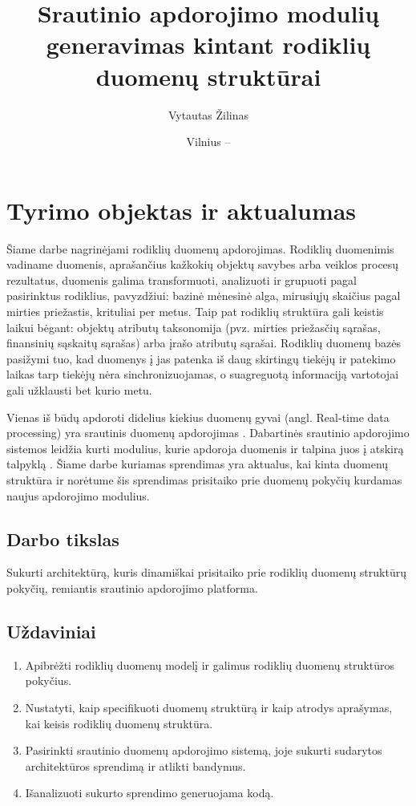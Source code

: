 \documentclass{VUMIFPSbakalaurinis}
\title{Srautinio apdorojimo modulių generavimas kintant rodiklių duomenų struktūrai}
\author{Vytautas Žilinas}
\date{Vilnius – \the\year}
\begin{document}
 
\maketitle

\cleardoublepage{}
\setcounter{page}{2}

\section{Tyrimo objektas ir aktualumas}
Šiame darbe nagrinėjami rodiklių duomenų apdorojimas. Rodiklių duomenimis vadiname duomenis, aprašančius kažkokių objektų savybes arba veiklos procesų rezultatus, 
duomenis galima transformuoti, analizuoti ir grupuoti pagal pasirinktus rodiklius, 
pavyzdžiui: bazinė mėnesinė alga, mirusiųjų skaičius pagal mirties priežastis, krituliai per metus. Taip pat rodiklių struktūra gali keistis laikui bėgant: 
objektų atributų taksonomija (pvz. mirties priežasčių sąrašas, finansinių sąskaitų sąrašas) arba įrašo atributų sąrašai.
Rodiklių duomenų bazės pasižymi tuo, kad duomenys į jas patenka iš daug skirtingų tiekėjų ir patekimo laikas tarp tiekėjų nėra 
sinchronizuojamas, o suagreguotą informaciją vartotojai gali užklausti bet kurio metu.  \par
Vienas iš būdų apdoroti didelius kiekius duomenų gyvai (angl. Real-time data processing) yra srautinis duomenų apdorojimas \cite{BigData, StreamProcessingInData}. 
Dabartinės srautinio apdorojimo sistemos leidžia kurti modulius, kurie apdoroja duomenis ir talpina juos į atskirą talpyklą \cite{8Requirements}. 
Šiame darbe kuriamas sprendimas yra aktualus, kai kinta duomenų struktūra ir norėtume šis sprendimas prisitaiko 
prie duomenų pokyčių kurdamas naujus apdorojimo modulius.

\subsection{Darbo tikslas}
Sukurti architektūrą, kuris dinamiškai prisitaiko prie rodiklių duomenų struktūrų pokyčių, remiantis srautinio apdorojimo platforma.
\subsection{Uždaviniai}
\begin{enumerate}
    \item Apibrėžti rodiklių duomenų modelį ir galimus rodiklių duomenų struktūros pokyčius.
    \item Nustatyti, kaip specifikuoti duomenų struktūrą ir kaip atrodys aprašymas, kai keisis rodiklių duomenų struktūra.
    \item Pasirinkti srautinio duomenų apdorojimo sistemą, joje sukurti sudarytos architektūros sprendimą ir atlikti bandymus.
    \item Išanalizuoti sukurto sprendimo generuojama kodą.
\end{enumerate}
\end{document}

